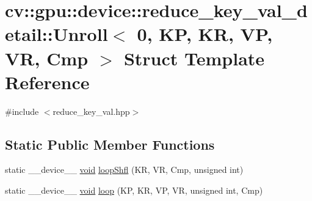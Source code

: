 \hypertarget{structcv_1_1gpu_1_1device_1_1reduce__key__val__detail_1_1Unroll_3_010_00_01KP_00_01KR_00_01VP_00_01VR_00_01Cmp_01_4}{\section{cv\-:\-:gpu\-:\-:device\-:\-:reduce\-\_\-key\-\_\-val\-\_\-detail\-:\-:Unroll$<$ 0, K\-P, K\-R, V\-P, V\-R, Cmp $>$ Struct Template Reference}
\label{structcv_1_1gpu_1_1device_1_1reduce__key__val__detail_1_1Unroll_3_010_00_01KP_00_01KR_00_01VP_00_01VR_00_01Cmp_01_4}
}


{\ttfamily \#include $<$reduce\-\_\-key\-\_\-val.\-hpp$>$}

\subsection*{Static Public Member Functions}
\begin{DoxyCompactItemize}
\item 
static \-\_\-\-\_\-device\-\_\-\-\_\- \hyperlink{legacy_8hpp_a8bb47f092d473522721002c86c13b94e}{void} \hyperlink{structcv_1_1gpu_1_1device_1_1reduce__key__val__detail_1_1Unroll_3_010_00_01KP_00_01KR_00_01VP_00_01VR_00_01Cmp_01_4_ae4a766f5286e6a924371bfb2f1df6d4c}{loop\-Shfl} (K\-R, V\-R, Cmp, unsigned int)
\item 
static \-\_\-\-\_\-device\-\_\-\-\_\- \hyperlink{legacy_8hpp_a8bb47f092d473522721002c86c13b94e}{void} \hyperlink{structcv_1_1gpu_1_1device_1_1reduce__key__val__detail_1_1Unroll_3_010_00_01KP_00_01KR_00_01VP_00_01VR_00_01Cmp_01_4_afb4491a3b2419c9970a0dc96b9ea07ae}{loop} (K\-P, K\-R, V\-P, V\-R, unsigned int, Cmp)
\end{DoxyCompactItemize}


